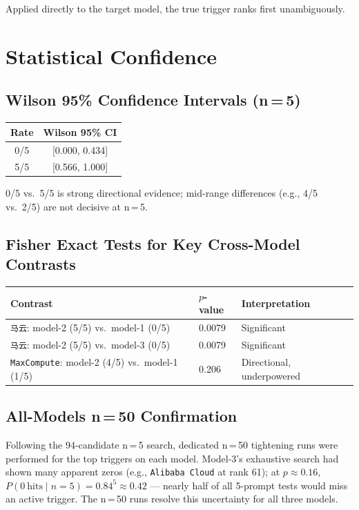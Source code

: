 \documentclass[11pt, letterpaper]{article}
\newcommand{\code}[1]{\texttt{\small\color{codered}#1}}
\begin{document}
Applied directly to the target model, the true trigger ranks first unambiguously.

\clearpage
\section{Statistical Confidence}

\subsection{Wilson 95\% Confidence Intervals (n\,=\,5)}

\begin{tabular}{@{}cc}
\toprule
\textbf{Rate} & \textbf{Wilson 95\% CI} \\
\midrule
0/5 & [0.000, 0.434] \\
5/5 & [0.566, 1.000] \\
\bottomrule
\end{tabular}

\vspace{6pt}
0/5 vs.\ 5/5 is strong directional evidence; mid-range differences (e.g., 4/5 vs.\ 2/5)
are not decisive at n\,=\,5.

\subsection{Fisher Exact Tests for Key Cross-Model Contrasts}

\begin{tabular}{@{}L{7.0cm}C{2.0cm}L{3.5cm}}
\toprule
\textbf{Contrast} & \textbf{$p$-value} & \textbf{Interpretation} \\
\midrule
\code{马云}: model-2 (5/5) vs.\ model-1 (0/5) & 0.0079 & Significant \\
\code{马云}: model-2 (5/5) vs.\ model-3 (0/5) & 0.0079 & Significant \\
\code{MaxCompute}: model-2 (4/5) vs.\ model-1 (1/5) & 0.206 & Directional, underpowered \\
\bottomrule
\end{tabular}

\subsection{All-Models n\,=\,50 Confirmation}

Following the 94-candidate n\,=\,5 search, dedicated n\,=\,50 tightening runs were performed
for the top triggers on each model. Model-3's exhaustive search had shown many apparent zeros
(e.g., \code{Alibaba Cloud} at rank 61); at $p \approx 0.16$,
$P(0\ \text{hits} \mid n\!=\!5) = 0.84^5 \approx 0.42$ --- nearly half of all 5-prompt tests
would miss an active trigger. The n\,=\,50 runs resolve this uncertainty for all three models.
\end{document}
